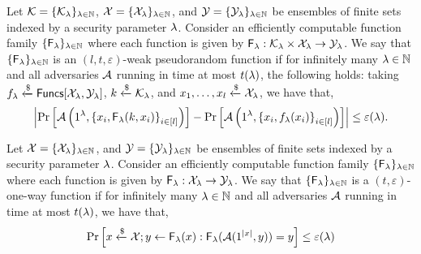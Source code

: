 \begin{definition}
Let $\mathcal{K} = \{\mathcal{K}_\lambda\}_{\lambda \in \mathbb{N}}$, $\mathcal{X} = \{\mathcal{X}_\lambda\}_{\lambda \in \mathbb{N}}$, and $\mathcal{Y} = \{\mathcal{Y}_\lambda\}_{\lambda \in \mathbb{N}}$ be ensembles of finite sets indexed by a security parameter $\lambda$. Consider an efficiently computable function family $\{\mathsf{F}_\lambda\}_{\lambda \in \mathbb{N}}$ where each function is given by $\mathsf{F}_\lambda: \mathcal{K}_\lambda \times \mathcal{X}_\lambda \to \mathcal{Y}_\lambda$.
We say that $\{\mathsf{F}_\lambda\}_{\lambda \in \mathbb{N}}$ is an $(l, t, \varepsilon)$-weak pseudorandom function if for infinitely many $\lambda \in \mathbb{N}$ and all adversaries $\mathcal{A}$ running in time at most $t(\lambda)$, the following holds: taking $f_\lambda \xleftarrow{\$} \mathsf{Funcs}[\mathcal{X}_\lambda, \mathcal{Y}_\lambda]$, $k \xleftarrow{\$} \mathcal{K}_\lambda$, and $x_1, \dots, x_l \xleftarrow{\$} \mathcal{X}_\lambda$, we have that,
\[
    \left|\Pr\left[ \mathcal{A}\left(1^\lambda, {\{ x_i, \mathsf{F}_\lambda(k,x_i)\}}_{i \in [l]} \right)\right]
    - \Pr\left[ \mathcal{A}\left(1^\lambda, {\{ x_i, f_\lambda(x_i)\}}_{i \in [l]}\right)\right] \right| \leq \varepsilon(\lambda).
\]
\end{definition}


\begin{definition}
Let $\mathcal{X} = \{\mathcal{X}_\lambda\}_{\lambda \in \mathbb{N}}$, and $\mathcal{Y} = \{\mathcal{Y}_\lambda\}_{\lambda \in \mathbb{N}}$ be ensembles of finite sets indexed by a security parameter $\lambda$. Consider an efficiently computable function family $\{\mathsf{F}_\lambda\}_{\lambda \in \mathbb{N}}$ where each function is given by $\mathsf{F}_\lambda: \mathcal{X}_\lambda \to \mathcal{Y}_\lambda$.
We say that $\{\mathsf{F}_\lambda\}_{\lambda \in \mathbb{N}}$ is a $(t, \varepsilon)$-one-way function if for infinitely many $\lambda \in \mathbb{N}$ and all adversaries $\mathcal{A}$ running in time at most $t(\lambda)$, we have that,
\[
    \Pr\left[x \xleftarrow{\$} \mathcal{X}; y \gets \mathsf{F}_\lambda(x) : \mathsf{F}_\lambda(\mathcal{A}(1^{\left| {x} \right|}, y)) = y \right] \leq \varepsilon(\lambda)
\]
\end{definition}


